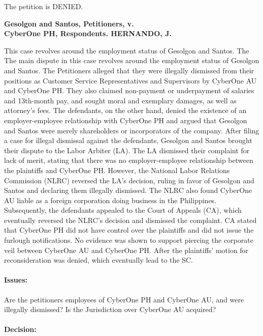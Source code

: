 \documentclass[
12pt,
oneside,
onehalfspacing,
headsepline
]{DigestCollection}
\begin{document}
The petition is DENIED.


\noindent\textbf{Gesolgon and Santos, Petitioners, v. \\CyberOne PH, Respondents. HERNANDO, J.}\vspace{0.4cm}

This case revolves around the employment status of Gesolgon and Santos. The The main dispute in this case revolves around the employment status of Gesolgon and Santos. The Petitioners alleged that they were illegally dismissed from their positions as Customer Service Representatives and Supervisors by CyberOne AU and CyberOne PH. They also claimed non-payment or underpayment of salaries and 13th-month pay, and sought moral and exemplary damages, as well as attorney's fees. The defendants, on the other hand, denied the existence of an employer-employee relationship with CyberOne PH and argued that Gesolgon and Santos were merely shareholders or incorporators of the company. After filing a case for illegal dismissal against the defendants, Gesolgon and Santos brought their dispute to the Labor Arbiter (LA). The LA dismissed their complaint for lack of merit, stating that there was no employer-employee relationship between the plaintiffs and CyberOne PH. However, the National Labor Relations Commission (NLRC) reversed the LA's decision, ruling in favor of Gesolgon and Santos and declaring them illegally dismissed. The NLRC also found CyberOne AU liable as a foreign corporation doing business in the Philippines. Subsequently, the defendants appealed to the Court of Appeals (CA), which eventually reversed the NLRC's decision and dismissed the complaint. CA stated that CyberOne PH did not have control over the plaintiffs and did not issue the furlough notifications. No evidence was shown to support piercing the corporate veil between CyberOne AU and CyberOne PH. After the plaintiffs' motion for reconsideration was denied, which eventually lead to the SC.

\paragraph{Issues: }
\label{7e3e6950-09fd-11ef-932c-63c852f65e48}


Are the petitioners employees of CyberOne PH and CyberOne AU, and were illegally dismissed? Is the Jurisdiction over CyberOne AU acquired?

\paragraph{Decision:}
\label{7fbb1e40-09fd-11ef-932c-63c852f65e48}
\end{document}
